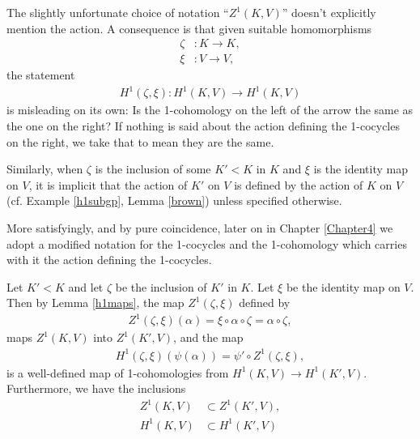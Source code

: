 \begin{remark}
	The slightly unfortunate choice of notation ``$Z^1(K, V)$'' doesn't explicitly mention the action. A consequence is that given suitable homomorphisms
	\begin{align*}
		\zeta&:K \rightarrow K, \\
		\xi&: V \rightarrow V,
	\end{align*}
	the statement
	\begin{align*}
		H^1(\zeta, \xi):H^1(K, V) \rightarrow H^1(K, V)
	\end{align*}
	is misleading on its own: Is the 1-cohomology on the left of the arrow the same as the one on the right? If nothing is said about the action defining the 1-cocycles on the right, we take that to mean they are the same.

	Similarly, when $\zeta$ is the inclusion of some $K' < K$ in $K$ and $\xi$ is the identity map on $V$, it is implicit that the action of $K'$ on $V$ is defined by the action of $K$ on $V$ (cf. Example \ref{h1subgp}, Lemma \ref{brown}) unless specified otherwise.

	More satisfyingly, and by pure coincidence, later on in Chapter \ref{Chapter4} we adopt a modified notation for the 1-cocycles and the 1-cohomology which carries with it the action defining the 1-cocycles.
\end{remark}

\begin{example} \label{h1subgp}
	Let $K' < K$ and let $\zeta$ be the inclusion of $K'$ in $K$. Let $\xi$ be the identity map on $V$. Then by Lemma \ref{h1maps}, the map $Z^1(\zeta, \xi)$ defined by
\begin{align*}
	Z^1(\zeta, \xi)(\alpha) = \xi \circ \alpha \circ \zeta = \alpha \circ \zeta,
\end{align*}
maps $Z^1(K, V)$ into $Z^1(K', V)$, and the map
\begin{align*}
	H^1(\zeta, \xi)(\psi(\alpha)) = \psi' \circ Z^1(\zeta, \xi),
\end{align*}
is a well-defined map of 1-cohomologies from $H^1(K, V) \rightarrow H^1(K', V)$. Furthermore, we have the inclusions
\begin{align*}
	Z^1(K, V) &\subset Z^1(K', V),\\ H^1(K, V) &\subset H^1(K', V)
\end{align*}
\end{example}

